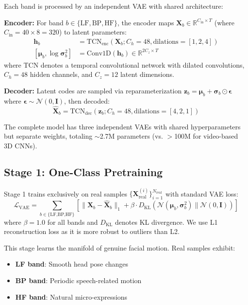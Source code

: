 \documentclass[11pt,twocolumn]{article}
\begin{document}
Each band is processed by an independent VAE with shared architecture:

\textbf{Encoder:} For band $b \in \{\text{LF}, \text{BP}, \text{HF}\}$, the encoder maps $\mathbf{X}_b \in \mathbb{R}^{C_{\text{in}} \times T}$ (where $C_{\text{in}} = 40 \times 8 = 320$) to latent parameters:
\begin{align}
    \mathbf{h}_b &= \text{TCN}_{\text{enc}}(\mathbf{X}_b; C_h=48, \text{dilations}=[1,2,4]) \\
    [\boldsymbol{\mu}_b, \log\boldsymbol{\sigma}^2_b] &= \text{Conv1D}(\mathbf{h}_b) \in \mathbb{R}^{2C_z \times T}
\end{align}
where TCN denotes a temporal convolutional network with dilated convolutions, $C_h=48$ hidden channels, and $C_z=12$ latent dimensions.

\textbf{Decoder:} Latent codes are sampled via reparameterization $\mathbf{z}_b = \boldsymbol{\mu}_b + \boldsymbol{\sigma}_b \odot \boldsymbol{\epsilon}$ where $\boldsymbol{\epsilon} \sim \mathcal{N}(0, \mathbf{I})$, then decoded:
\begin{equation}
    \hat{\mathbf{X}}_b = \text{TCN}_{\text{dec}}(\mathbf{z}_b; C_h=48, \text{dilations}=[4,2,1])
\end{equation}

The complete model has three independent VAEs with shared hyperparameters but separate weights, totaling $\sim$2.7M parameters (vs. $>$100M for video-based 3D CNNs).

\subsection{Stage 1: One-Class Pretraining}

Stage 1 trains exclusively on real samples $\{\mathbf{X}^{(i)}_{\text{real}}\}_{i=1}^{N_{\text{real}}}$ with standard VAE loss:
\begin{equation}
\mathcal{L}_{\text{VAE}} = \sum_{b \in \{\text{LF,BP,HF}\}} \left[ \|\mathbf{X}_b - \hat{\mathbf{X}}_b\|_1 + \beta \cdot D_{\text{KL}}(\mathcal{N}(\boldsymbol{\mu}_b, \boldsymbol{\sigma}^2_b) \| \mathcal{N}(0, \mathbf{I})) \right]
\end{equation}
where $\beta=1.0$ for all bands and $D_{\text{KL}}$ denotes KL divergence. We use L1 reconstruction loss as it is more robust to outliers than L2.

This stage learns the manifold of genuine facial motion. Real samples exhibit:
\begin{itemize}
    \item \textbf{LF band}: Smooth head pose changes
    \item \textbf{BP band}: Periodic speech-related motion
    \item \textbf{HF band}: Natural micro-expressions
\end{itemize}
\end{document}
